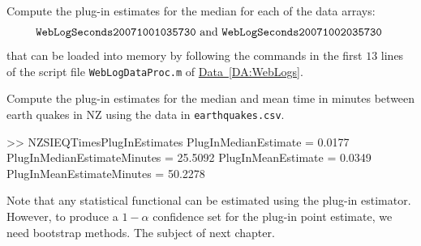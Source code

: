 \begin{labwork}
Compute the plug-in estimates for the median for each of the data arrays:
\[
\text{{\tt WebLogSeconds20071001035730} and {\tt WebLogSeconds20071002035730} }
\]
that can be loaded into memory by following the commands in the first $13$ lines of the script file {\tt WebLogDataProc.m} of \hyperref[DA:WebLogs]{Data~\ref*{DA:WebLogs}}.
\end{labwork}

\begin{labwork}\label{LW:PlugInEstimatesEarthQuakes}
Compute the plug-in estimates for the median and mean time in minutes between earth quakes in NZ using the data in {\tt earthquakes.csv}. 
\begin{VrbM}
>> NZSIEQTimesPlugInEstimates
PlugInMedianEstimate =    0.0177
PlugInMedianEstimateMinutes =   25.5092
PlugInMeanEstimate =    0.0349
PlugInMeanEstimateMinutes =   50.2278
\end{VrbM}
\end{labwork}

Note that any statistical functional can be estimated using the plug-in estimator.  However, to produce a $1-\alpha$ confidence set for the plug-in point estimate, we need bootstrap methods.  The subject of next chapter.


